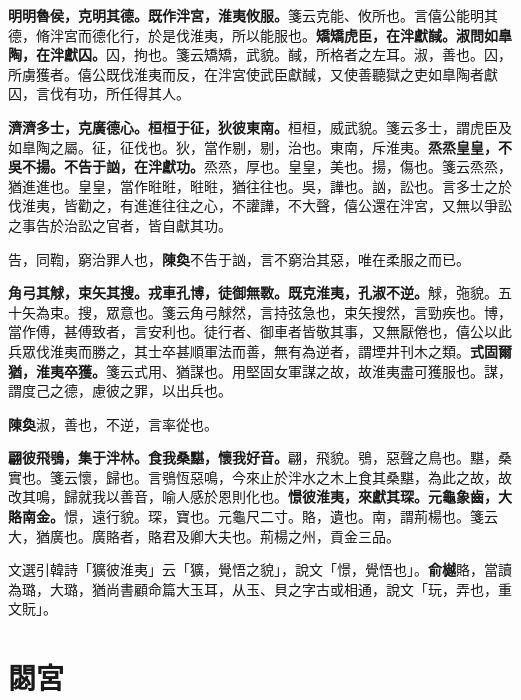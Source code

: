 \textbf{明明魯侯，克明其德。既作泮宮，淮夷攸服。}{\footnotesize 箋云克能、攸所也。言僖公能明其德，脩泮宮而德化行，於是伐淮夷，所以能服也。}\textbf{矯矯虎臣，在泮獻馘。淑問如臯陶，在泮獻囚。}{\footnotesize 囚，拘也。箋云矯矯，武貌。馘，所格者之左耳。淑，善也。囚，所虜獲者。僖公既伐淮夷而反，在泮宮使武臣獻馘，又使善聽獄之吏如臯陶者獻囚，言伐有功，所任得其人。}

\textbf{濟濟多士，克廣德心。桓桓于征，狄彼東南。}{\footnotesize 桓桓，威武貌。箋云多士，謂虎臣及如臯陶之屬。征，征伐也。狄，當作剔，剔，治也。東南，斥淮夷。}\textbf{烝烝皇皇，不吳不揚。不告于訩，在泮獻功。}{\footnotesize 烝烝，厚也。皇皇，美也。揚，傷也。箋云烝烝，猶進進也。皇皇，當作暀暀，暀暀，猶往往也。吳，譁也。訩，訟也。言多士之於伐淮夷，皆勸之，有進進往往之心，不讙譁，不大聲，僖公還在泮宮，又無以爭訟之事告於治訟之官者，皆自獻其功。}

\begin{quoting}告，同鞫，窮治罪人也，\textbf{陳奐}不告于訩，言不窮治其惡，唯在柔服之而已。\end{quoting}

\textbf{角弓其觩，束矢其搜。戎車孔博，徒御無斁。既克淮夷，孔淑不逆。}{\footnotesize 觩，㢮貌。五十矢為束。搜，眾意也。箋云角弓觩然，言持弦急也，束矢搜然，言勁疾也。博，當作傅，甚傅致者，言安利也。徒行者、御車者皆敬其事，又無厭倦也，僖公以此兵眾伐淮夷而勝之，其士卒甚順軍法而善，無有為逆者，謂堙井刊木之類。}\textbf{式固爾猶，淮夷卒獲。}{\footnotesize 箋云式用、猶謀也。用堅固女軍謀之故，故淮夷盡可獲服也。謀，謂度己之德，慮彼之罪，以出兵也。}

\begin{quoting}\textbf{陳奐}淑，善也，不逆，言率從也。\end{quoting}

\textbf{翩彼飛鴞，集于泮林。食我桑黮，懷我好音。}{\footnotesize 翩，飛貌。鴞，惡聲之鳥也。黮，桑實也。箋云懷，歸也。言鴞恆惡鳴，今來止於泮水之木上食其桑黮，為此之故，故改其鳴，歸就我以善音，喻人感於恩則化也。}\textbf{憬彼淮夷，來獻其琛。元龜象齒，大賂南金。}{\footnotesize 憬，遠行貌。琛，寶也。元龜尺二寸。賂，遺也。南，謂荊楊也。箋云大，猶廣也。廣賂者，賂君及卿大夫也。荊楊之州，貢金三品。}

\begin{quoting}文選引韓詩「獷彼淮夷」云「獷，覺悟之貌」，說文「憬，覺悟也」。\textbf{俞樾}賂，當讀為璐，大璐，猶尚書顧命篇大玉耳，从玉、貝之字古或相通，說文「玩，弄也，重文貦」。\end{quoting}

\section{閟宮}

